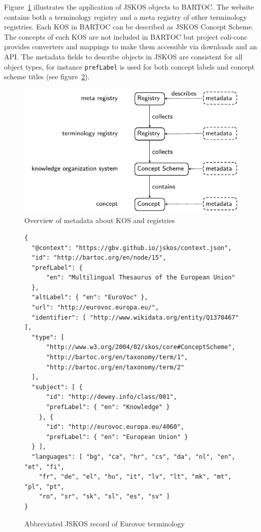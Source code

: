 \documentclass[12pt,a4paper]{llncs}
\begin{document}
\noindent
Figure~\ref{fig:kos} illustrates the application of JSKOS objects to BARTOC. The website contains both a terminology registry and a meta registry of other terminology registries. Each KOS in BARTOC can be described as JSKOS Concept Scheme. The concepts of each KOS are not included in BARTOC but project coli-conc provides converters and mappings to make them accessible via downloads and an API. The metadata fields to describe objects in JSKOS are consistent for all object types, for instance \verb|prefLabel| is used for both concept labels and concept scheme titles (see figure~\ref{fig:concept-scheme-example}).

\begin{figure}
\includegraphics[]{kos}
\caption{Overview of metadata about KOS and registries}
\label{fig:kos}
\end{figure}

\begin{figure}
\begin{verbatim}
{
  "@context": "https://gbv.github.io/jskos/context.json",
  "id": "http://bartoc.org/en/node/15",
  "prefLabel": {
      "en": "Multilingual Thesaurus of the European Union"
  },
  "altLabel": { "en": "EuroVoc" },
  "url": "http://eurovoc.europa.eu/",
  "identifier": [ "http://www.wikidata.org/entity/Q1370467" ],
  "type": [
      "http://www.w3.org/2004/02/skos/core#ConceptScheme",
      "http://bartoc.org/en/taxonomy/term/1",
      "http://bartoc.org/en/taxonomy/term/2"
  ],
  "subject": [ {
      "id": "http://dewey.info/class/001",
      "prefLabel": { "en": "Knowledge" }
    }, {
      "id": "http://eurovoc.europa.eu/4060",
      "prefLabel": { "en": "European Union" }
  } ],
  "languages": [ "bg", "ca", "hr", "cs", "da", "nl", "en", "et", "fi",
    "fr", "de", "el", "hu", "it", "lv", "lt", "mk", "mt", "pl", "pt",
    "ro", "sr", "sk", "sl", "es", "sv" ]
}
\end{verbatim}
\caption{Abbreviated JSKOS record of Eurovoc terminology}
\label{fig:concept-scheme-example}
\end{figure}
\end{document}
